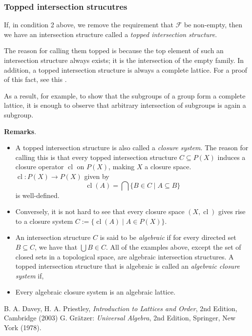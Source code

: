\documentclass[12pt]{article}
\begin{document}
\subsubsection*{Topped intersection strucutres}

If, in condition 2 above, we remove the requirement that $\mathcal{F}$ be non-empty, then we have an intersection structure called a \emph{topped intersection structure}.

The reason for calling them topped is because the top element of such an intersection structure always exists; it is the intersection of the empty family.  In addition, a topped intersection structure is always a complete lattice.  For a proof of this fact, see this .

As a result, for example, to show that the subgroups of a group form a complete lattice, it is enough to observe that arbitrary intersection of subgroups is again a subgroup.

\textbf{Remarks}.  
\begin{itemize}
\item
A topped intersection structure is also called a \emph{closure system}.  The reason for calling this is that every topped intersection structure $C\subseteq P(X)$ induces a closure operator $\operatorname{cl}$ on $P(X)$, making $X$ a closure space.  $\operatorname{cl}:P(X)\to P(X)$ given by $$\operatorname{cl}(A)=\bigcap \lbrace B\in C\mid A\subseteq B\rbrace$$ is well-defined.  
\item
Conversely, it is not hard to see that every closure space $(X,\operatorname{cl})$ gives rise to a closure system $C:=\lbrace \operatorname{cl}(A)\mid A\in P(X)\rbrace$.
\item
An intersection structure $C$ is said to be \emph{algebraic} if for every directed set $B\subseteq C$, we have that $\bigcup B\in C$.  All of the examples above, except the set of closed sets in a topological space, are algebraic intersection structures.  A topped intersection structure that is algebraic is called an \emph{algebraic closure system} if,   
\item
Every algebraic closure system is an algebraic lattice.
\end{itemize}

\begin{thebibliography}{6}
 B. A. Davey, H. A. Priestley, {\it Introduction to Lattices and Order}, 2nd Edition, Cambridge (2003)
 G. Gr\"{a}tzer: {\em Universal Algebra}, 2nd Edition, Springer, New York (1978).
\end{thebibliography}

\end{document}
